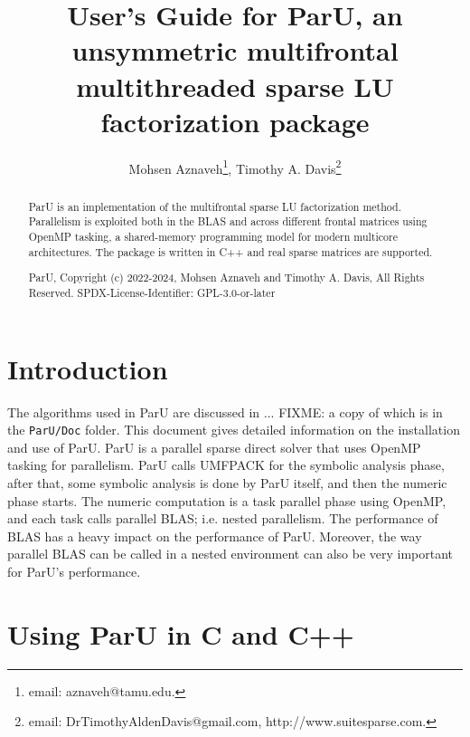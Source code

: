 \documentclass[12pt]{article}
\title{User's Guide for ParU, an unsymmetric multifrontal multithreaded sparse
LU factorization package}
\author{Mohsen Aznaveh\thanks{email: aznaveh@tamu.edu.},
Timothy A. Davis\thanks{email: DrTimothyAldenDavis@gmail.com,
http://www.suitesparse.com.}}
\begin{document}
\maketitle

\begin{abstract}

ParU is an implementation of the multifrontal sparse LU factorization method.
Parallelism is exploited both in the BLAS and across different frontal matrices
using OpenMP tasking, a shared-memory programming model for modern multicore
architectures. The package is written in C++ and real sparse matrices are
supported.

ParU, Copyright (c) 2022-2024, Mohsen Aznaveh and Timothy A. Davis,
All Rights Reserved.
SPDX-License-Identifier: GPL-3.0-or-later
\end{abstract}

\newpage
{\small
\tableofcontents
}

\section{Introduction}
\label{intro}

The algorithms used in ParU are discussed in ...  FIXME:
a copy of which is in the \verb'ParU/Doc' folder.
This document gives detailed information on the installation and use of ParU.
ParU is a parallel sparse direct solver that uses OpenMP tasking for
parallelism. ParU calls UMFPACK for the symbolic analysis phase, after that,
some symbolic analysis is done by ParU itself, and then the numeric phase
starts. The numeric computation is a task parallel phase using OpenMP, and each
task calls parallel BLAS; i.e. nested parallelism.  The performance of BLAS has
a heavy impact on the performance of ParU. Moreover, the way parallel BLAS can
be called in a nested environment can also be very important for ParU's
performance.

\section{Using ParU in C and C++}
\end{document}
